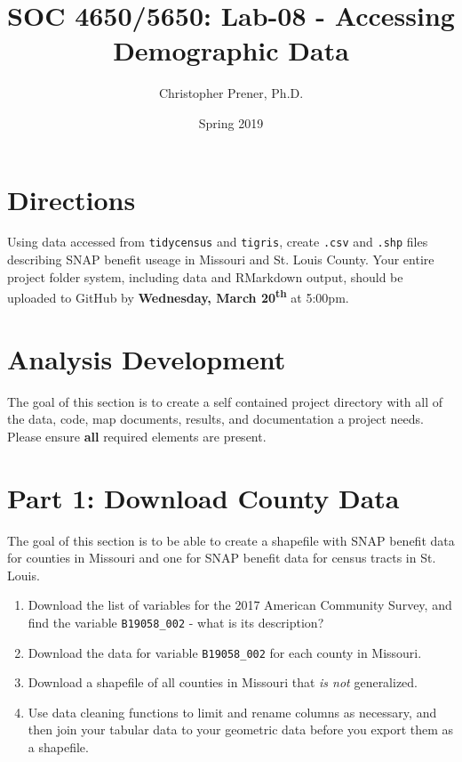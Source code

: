\documentclass{tufte-handout}
\title{SOC 4650/5650: Lab-08 - Accessing Demographic Data}
\author{Christopher Prener, Ph.D.}
\date{Spring 2019}
\begin{document}
\maketitle %

\vspace{5mm}
\section{Directions}
Using data accessed from \texttt{tidycensus} and \texttt{tigris}, create \texttt{.csv} and \texttt{.shp} files describing SNAP benefit useage in Missouri and St. Louis County. Your entire project folder system, including data and RMarkdown output, should be uploaded to GitHub by \textbf{Wednesday, March 20\textsuperscript{th}} at 5:00pm.

\section{Analysis Development}
The goal of this section is to create a self contained project directory with all of the data, code, map documents, results, and documentation a project needs. Please ensure \textbf{all} required elements are present.

\vspace{5mm}
\section{Part 1: Download County Data}
The goal of this section is to be able to create a shapefile with SNAP benefit data for counties in Missouri and one for SNAP benefit data for census tracts in St. Louis.
\begin{enumerate}
\item Download the list of variables for the 2017 American Community Survey, and find the variable \texttt{B19058\_002} - what is its description?
\item Download the data for variable \texttt{B19058\_002} for each county in Missouri.
\item Download a shapefile of all counties in Missouri that \textit{is not} generalized. 
\item Use data cleaning functions to limit and rename columns as necessary, and then join your tabular data to your geometric data before you export them as a shapefile.
\end{enumerate}
\end{document}
